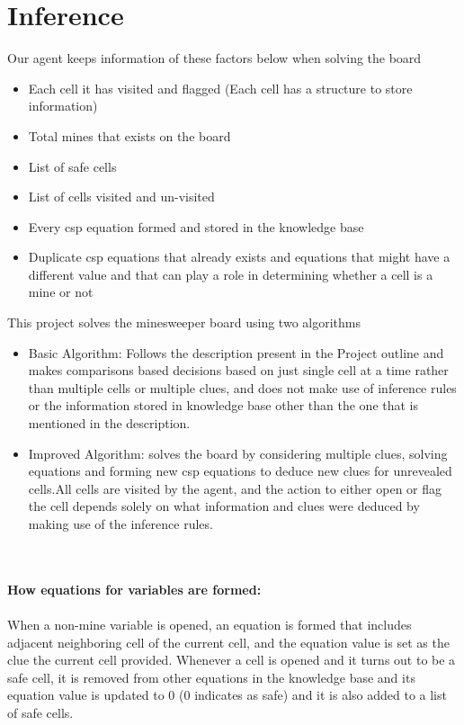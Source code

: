 \documentclass{article}
\begin{document}
\section{Inference}
Our agent keeps information of these factors below when solving the board
\begin{itemize}
\item Each cell it has visited and flagged (Each cell has a structure to store information)
\item Total mines that exists on the board
\end{itemize}
\begin{itemize}
\item List of safe cells
\end{itemize}
\begin{itemize}
\item List of cells visited and un-visited 
\end{itemize}
\begin{itemize}
\item Every csp equation formed and stored in the knowledge base
\item Duplicate csp equations that already exists and equations that might have a different  value and that can play a role in determining whether a cell is a mine or not
\end{itemize}

This project solves the minesweeper board using two algorithms

\begin{itemize}
\begin{itemize}
\item  Basic Algorithm: Follows the description present in the Project outline and makes comparisons based decisions based on just single cell at a time rather than multiple cells or multiple clues, and does not make use of inference rules or the information stored in knowledge base other than the one that is mentioned in the description.
\end{itemize}
\begin{itemize}
\item Improved Algorithm: solves the board by considering multiple clues, solving equations and forming new csp equations to deduce new clues for  unrevealed cells.All cells are visited by the agent, and the action to either open or flag the cell depends solely on what information and clues were deduced by making use of the inference rules.
\end{itemize}
\end{itemize}
\\ \\ 
\textbf{How equations for variables are formed: }
\\ \\ 
When a non-mine variable is opened, an equation is formed that includes adjacent neighboring cell of the current cell, and the equation value is set as the clue the current cell provided.  Whenever a cell is opened and it turns out to be a safe cell, it is removed from other equations in the knowledge base and its equation value is updated to 0 (0 indicates as safe) and it is also added to a list of safe cells.
\end{document}
